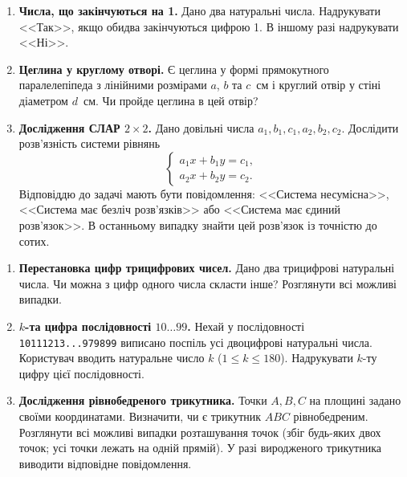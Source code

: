 	{\large
		\begin{enumerate}
			\item \textbf{Числа, що закінчуються на 1.} Дано два натуральні числа. Надрукувати <<Так>>, якщо обидва закінчуються цифрою 1. В іншому разі надрукувати <<Ні>>.
			\item \textbf{Цеглина у круглому отворі.} Є цеглина у формі прямокутного паралелепіпеда з лінійними розмірами $a$, $b$ та $c$~см і круглий отвір у стіні діаметром $d$~см. Чи пройде цеглина в цей отвір?
			\item \textbf{Дослідження СЛАР $2\times 2$.} Дано довільні числа $a_1, b_1, c_1, a_2, b_2, c_2$. Дослідити розв'язність системи рівнянь
			$$
			\begin{cases}
				a_1 x + b_1 y = c_1, \\
				a_2 x + b_2 y = c_2.
			\end{cases}
			$$
			Відповіддю до задачі мають бути повідомлення: <<Система несумісна>>, <<Система має безліч розв'язків>> або <<Система має єдиний розв'язок>>. В останньому випадку знайти цей розв'язок із точністю до сотих.
		\end{enumerate}
	}
	
	\vspace{2cm}
	
		
	
	{\large
		\begin{enumerate}
			\item \textbf{Перестановка цифр трицифрових чисел.} Дано два трицифрові натуральні числа. Чи можна з цифр одного числа скласти інше? Розглянути всі можливі випадки.
			\item \textbf{$k$-та цифра послідовності $10\dots 99$.} Нехай у послідовності \texttt{10111213...979899} виписано поспіль усі двоцифрові натуральні числа. Користувач вводить натуральне число $k$ ($1 \leqslant k \leqslant 180$). Надрукувати $k$-ту цифру цієї послідовності.
			\item \textbf{Дослідження рівнобедреного трикутника.} Точки $A, B, C$ на площині задано своїми координатами. Визначити, чи є трикутник $ABC$ рівнобедреним. Розглянути всі можливі випадки розташування точок (збіг будь-яких двох точок; усі точки лежать на одній прямій). У разі виродженого трикутника виводити відповідне повідомлення.
		\end{enumerate}
	}
	
	
	
	
